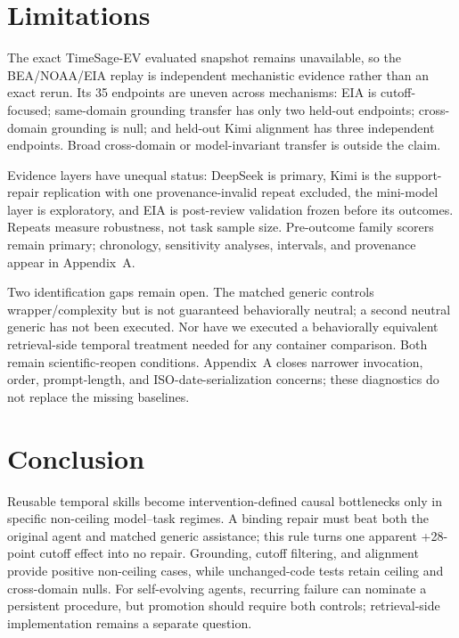 \section{Limitations}
\label{sec:limitations}
The exact TimeSage-EV evaluated snapshot remains unavailable, so the BEA/NOAA/EIA replay is independent mechanistic evidence rather than an exact rerun. Its 35 endpoints are uneven across mechanisms: EIA is cutoff-focused; same-domain grounding transfer has only two held-out endpoints; cross-domain grounding is null; and held-out Kimi alignment has three independent endpoints. Broad cross-domain or model-invariant transfer is outside the claim.

Evidence layers have unequal status: DeepSeek is primary, Kimi is the support-repair replication with one provenance-invalid repeat excluded, the mini-model layer is exploratory, and EIA is post-review validation frozen before its outcomes. Repeats measure robustness, not task sample size. Pre-outcome family scorers remain primary; chronology, sensitivity analyses, intervals, and provenance appear in Appendix~A.

Two identification gaps remain open. The matched generic controls wrapper/complexity but is not guaranteed behaviorally neutral; a second neutral generic has not been executed. Nor have we executed a behaviorally equivalent retrieval-side temporal treatment needed for any container comparison. Both remain scientific-reopen conditions. Appendix~A closes narrower invocation, order, prompt-length, and ISO-date-serialization concerns; these diagnostics do not replace the missing baselines.

\section{Conclusion}
Reusable temporal skills become intervention-defined causal bottlenecks only in specific non-ceiling model--task regimes. A binding repair must beat both the original agent and matched generic assistance; this rule turns one apparent +28-point cutoff effect into no repair. Grounding, cutoff filtering, and alignment provide positive non-ceiling cases, while unchanged-code tests retain ceiling and cross-domain nulls. For self-evolving agents, recurring failure can nominate a persistent procedure, but promotion should require both controls; retrieval-side implementation remains a separate question.
